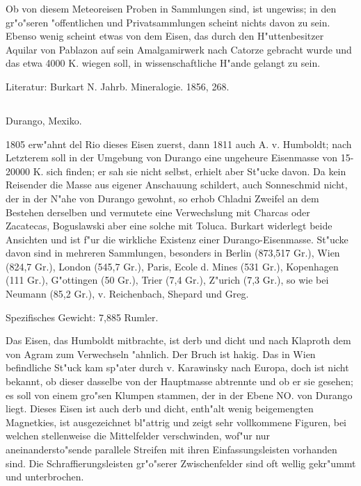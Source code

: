 \documentclass[a4paper, 11pt, oneside]{article}
\begin{document}
Ob von diesem Meteoreisen Proben in Sammlungen sind, ist ungewiss; in den gr"o"seren "offentlichen und Privatsammlungen scheint nichts davon zu sein. Ebenso wenig scheint etwas von dem Eisen, das durch den H"uttenbesitzer Aquilar von Pablazon auf sein Amalgamirwerk nach Catorze gebracht wurde und das etwa 4000 K. wiegen soll, in wissenschaftliche H"ande gelangt zu sein.

\normalsize
Literatur: Burkart N. Jahrb. Mineralogie. 1856, 268.

\subsection{}
\LARGE
\paragraph{}
Durango, Mexiko.

1805 erw"ahnt del Rio dieses Eisen zuerst, dann 1811 auch A. v. Humboldt; nach Letzterem soll in der Umgebung von Durango eine ungeheure Eisenmasse von 15-20000 K. sich finden; er sah sie nicht selbst, erhielt aber St"ucke davon. Da kein Reisender die Masse aus eigener Anschauung schildert, auch Sonneschmid nicht, der in der N"ahe von Durango gewohnt, so erhob Chladni Zweifel an dem Bestehen derselben und vermutete eine Verwechslung mit Charcas oder Zacatecas, Boguslawski aber eine solche mit Toluca. Burkart widerlegt beide Ansichten und ist f"ur die wirkliche Existenz einer Durango-Eisenmasse. St"ucke davon sind in mehreren Sammlungen, besonders in Berlin (873,517 Gr.), Wien (824,7 Gr.), London (545,7 Gr.), Paris, Ecole d. Mines (531 Gr.), Kopenhagen (111 Gr.), G"ottingen (50 Gr.), Trier (7,4 Gr.), Z"urich (7,3 Gr.), so wie bei Neumann (85,2 Gr.), v. Reichenbach, Shepard und Greg.

Spezifisches Gewicht: 7,885 Rumler.

Das Eisen, das Humboldt mitbrachte, ist derb und dicht und nach Klaproth dem von Agram zum Verwechseln "ahnlich. Der Bruch ist hakig. Das in Wien befindliche St"uck kam sp"ater durch v. Karawinsky nach Europa, doch ist nicht bekannt, ob dieser dasselbe von der Hauptmasse abtrennte und ob er sie gesehen; es soll von einem gro"sen Klumpen stammen, der in der Ebene NO. von Durango liegt. Dieses Eisen ist auch derb und dicht, enth"alt wenig beigemengten Magnetkies, ist ausgezeichnet bl"attrig und zeigt sehr vollkommene Figuren, bei welchen stellenweise die Mittelfelder verschwinden, wof"ur nur aneinandersto"sende parallele Streifen mit ihren Einfassungsleisten vorhanden sind. Die Schraffierungsleisten gr"o"serer Zwischenfelder sind oft wellig gekr"ummt und unterbrochen.
\end{document}
